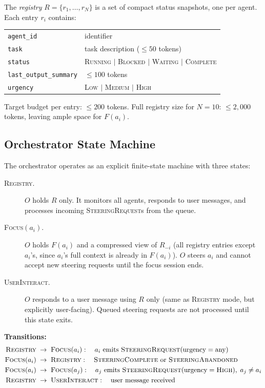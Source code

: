 \documentclass{article}
\begin{document}
The \emph{registry} $R = \{r_1, \ldots, r_N\}$ is a set of compact status
snapshots, one per agent.
Each entry $r_i$ contains:

\begin{center}
\begin{tabular}{ll}
\texttt{agent\_id} & identifier \\
\texttt{task} & task description ($\leq 50$ tokens) \\
\texttt{status} & \textsc{Running} $|$ \textsc{Blocked} $|$ \textsc{Waiting} $|$ \textsc{Complete} \\
\texttt{last\_output\_summary} & $\leq 100$ tokens \\
\texttt{urgency} & \textsc{Low} $|$ \textsc{Medium} $|$ \textsc{High} \\
\end{tabular}
\end{center}

Target budget per entry: $\leq 200$ tokens.
Full registry size for $N=10$: $\leq 2{,}000$ tokens, leaving ample space for $F(a_i)$.

\subsection{Orchestrator State Machine}
\label{sec:fsm}

The orchestrator operates as an explicit finite-state machine with three states:

\begin{description}
  \item[\textsc{Registry}.] $O$ holds $R$ only.
  It monitors all agents, responds to user messages, and processes
  incoming \textsc{SteeringRequest}s from the queue.

  \item[\textsc{Focus}$(a_i)$.] $O$ holds $F(a_i)$ and a compressed view
  of $R_{-i}$ (all registry entries except $a_i$'s, since $a_i$'s full
  context is already in $F(a_i)$).
  $O$ steers $a_i$ and cannot accept new steering requests until the
  focus session ends.

  \item[\textsc{UserInteract}.] $O$ responds to a user message using $R$
  only (same as \textsc{Registry} mode, but explicitly user-facing).
  Queued steering requests are not processed until this state exits.
\end{description}

\noindent\textbf{Transitions:}
\begin{align}
  \textsc{Registry} &\;\to\; \textsc{Focus}(a_i): \quad
    a_i \text{ emits } \textsc{SteeringRequest}(\text{urgency} = \text{any}) \label{eq:t1}\\
  \textsc{Focus}(a_i) &\;\to\; \textsc{Registry}: \quad
    \textsc{SteeringComplete} \text{ or } \textsc{SteeringAbandoned} \label{eq:t2}\\
  \textsc{Focus}(a_i) &\;\to\; \textsc{Focus}(a_j): \quad
    a_j \text{ emits } \textsc{SteeringRequest}(\text{urgency} = \textsc{High}), \; a_j \neq a_i \label{eq:t3}\\
  \textsc{Registry} &\;\to\; \textsc{UserInteract}: \quad
    \text{user message received} \label{eq:t4}
\end{align}
\end{document}
